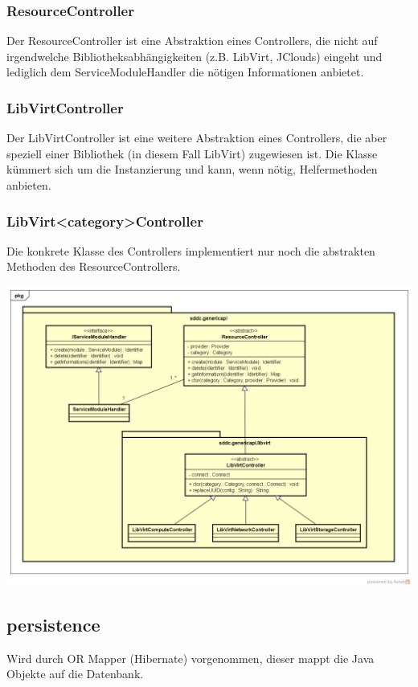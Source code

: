 \subsubsection{ResourceController}
Der ResourceController ist eine Abstraktion eines Controllers, die nicht auf irgendwelche 
Bibliotheksabhängigkeiten (z.B. LibVirt, JClouds) eingeht und lediglich dem ServiceModuleHandler die nötigen Informationen anbietet.

\subsubsection{LibVirtController}
Der LibVirtController ist eine weitere Abstraktion eines Controllers, die aber speziell einer 
Bibliothek (in diesem Fall LibVirt) zugewiesen ist. Die Klasse kümmert sich um die 
Instanzierung und kann, wenn nötig, Helfermethoden anbieten.

\subsubsection{LibVirt<category>Controller}

Die konkrete Klasse des Controllers implementiert nur noch die abstrakten Methoden des ResourceControllers.

\includegraphics[width=\textwidth]{./05_Design/04_Architektur/genericapi}

\subsection{persistence}

Wird durch OR Mapper (Hibernate) vorgenommen, dieser mappt die Java Objekte auf 
die Datenbank.

